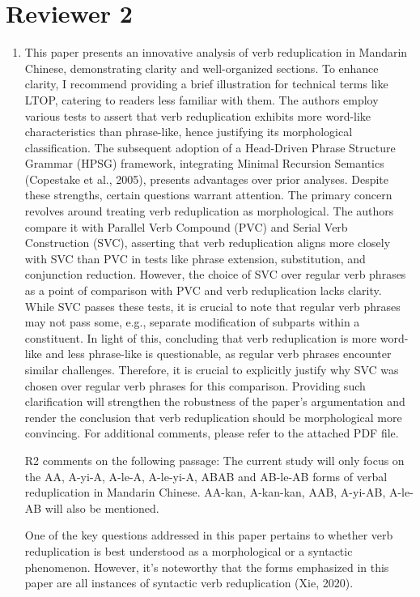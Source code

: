 \documentclass[fleqn,twoside]{article}
\begin{document}
\section{Reviewer 2}
\begin{enumerate}
\item
This paper presents an innovative analysis of verb reduplication in Mandarin Chinese, demonstrating
clarity and well-organized sections. To enhance clarity, I recommend providing a brief illustration for
technical terms like LTOP, catering to readers less familiar with them.
The authors employ various tests to assert that verb reduplication exhibits more word-like
characteristics than phrase-like, hence justifying its morphological classification. The subsequent
adoption of a Head-Driven Phrase Structure Grammar (HPSG) framework, integrating Minimal
Recursion Semantics (Copestake et al., 2005), presents advantages over prior analyses.
Despite these strengths, certain questions warrant attention. The primary concern revolves around
treating verb reduplication as morphological. The authors compare it with Parallel Verb Compound
(PVC) and Serial Verb Construction (SVC), asserting that verb reduplication aligns more closely with
SVC than PVC in tests like phrase extension, substitution, and conjunction reduction. However, the
choice of SVC over regular verb phrases as a point of comparison with PVC and verb reduplication
lacks clarity. While SVC passes these tests, it is crucial to note that regular verb phrases may not pass
some, e.g., separate modification of subparts within a constituent.
In light of this, concluding that verb reduplication is more word-like and less phrase-like is
questionable, as regular verb phrases encounter similar challenges. Therefore, it is crucial to
explicitly justify why SVC was chosen over regular verb phrases for this comparison. Providing such
clarification will strengthen the robustness of the paper's argumentation and render the conclusion
that verb reduplication should be morphological more convincing.
For additional comments, please refer to the attached PDF file.


R2 comments on the following passage: The current study will only focus on the AA, A-yi-A, A-le-A, A-le-yi-A, ABAB and
AB-le-AB forms of verbal reduplication in Mandarin Chinese. AA-kan, A-kan-kan,
AAB, A-yi-AB, A-le-AB will also be mentioned.

One of the key questions addressed in this paper pertains to whether verb reduplication is best understood as a morphological or a syntactic phenomenon. However, it's noteworthy that the forms emphasized in this paper are all instances of syntactic verb reduplication (Xie, 2020).


\end{enumerate}
\end{document}

